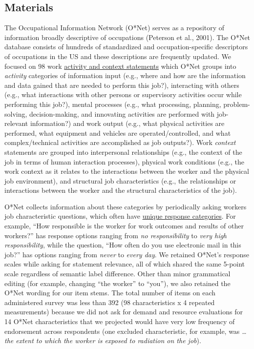 \documentclass[
  man,mask]{apa7}
\begin{document}
\hypertarget{materials}{%
\subsection{Materials}\label{materials}}

The Occupational Information Network (O*Net) serves as a repository of information broadly descriptive of occupations (Peterson et al., 2001). The O*Net database consists of hundreds of standardized and occupation-specific descriptors of occupations in the US and these descriptions are frequently updated. We focused on 98 work \href{https://www.ONETonline.org/find/descriptor/result/4.A.1.b.3}{activity and context statements} which O*Net groups into \emph{activity} categories of information input (e.g., where and how are the information and data gained that are needed to perform this job?), interacting with others (e.g., what interactions with other persons or supervisory activities occur while performing this job?), mental processes (e.g., what processing, planning, problem-solving, decision-making, and innovating activities are performed with job-relevant information?) and work output (e.g., what physical activities are performed, what equipment and vehicles are operated/controlled, and what complex/technical activities are accomplished as job outputs?). Work \emph{context} statements are grouped into interpersonal relationships (e.g., the context of the job in terms of human interaction processes), physical work conditions (e.g., the work context as it relates to the interactions between the worker and the physical job environment), and structural job characteristics (e.g., the relationships or interactions between the worker and the structural characteristics of the job).

O*Net collects information about these categories by periodically asking workers job characteristic questions, which often have \href{https://www.ONETonline.org/find/descriptor/result/4.C.1.c.2}{unique response categories}. For example, ``How responsible is the worker for work outcomes and results of other workers?'' has response options ranging from \emph{no responsibility} to \emph{very high responsibility}, while the question, ``How often do you use electronic mail in this job?'' has options ranging from \emph{never} to \emph{every day}. We retained O*Net's response scales while asking for statement relevance, all of which shared the same 5-point scale regardless of semantic label difference. Other than minor grammatical editing (for example, changing ``the worker'' to ``you''), we also retained the O*Net wording for our item stems. The total number of items on each administered survey was less than 392 (98 characteristics x 4 repeated measurements) because we did not ask for demand and resource evaluations for 14 O*Net characteristics that we projected would have very low frequency of endorsement across respondents (one excluded characteristic, for example, was \emph{\ldots the extent to which the worker is exposed to radiation on the job}).
\end{document}
